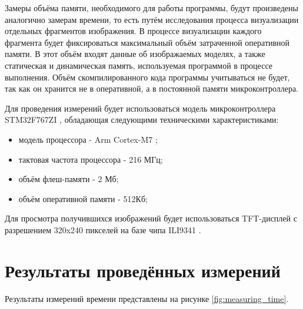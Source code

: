 Замеры объёма памяти, необходимого для работы программы, будут произведены аналогично замерам времени, то есть путём исследования 
процесса визуализации отдельных фрагментов изображения. В процессе визуализации каждого фрагмента будет фиксироваться максимальный 
объём затраченной оперативной памяти. В этот объём входят данные об изображаемых моделях, а также статическая и динамическая память, 
используемая программой в процессе выполнения. Объём скомпилированного кода программы учитываться не будет, так как он хранится 
не в оперативной, а в постоянной памяти микроконтроллера.

Для проведения измерений будет использоваться модель микроконтроллера STM32F767ZI \cite{STM32F767ZI}, обладающая следующими 
техническими характеристиками:
\begin{itemize}
	\item модель процессора - Arm Cortex-M7 \cite{cortex_m7};
	\item тактовая частота процессора - 216 МГц;
	\item объём флеш-памяти - 2 Мб;
    \item объём оперативной памяти - 512Кб;
\end{itemize}

Для просмотра получившихся изображений будет использоваться TFT-дисплей с разрешением 320x240 пикселей на базе чипа ILI9341 \cite{ili9341}.



\section{Результаты проведённых измерений}
Результаты измерений времени представлены на рисунке \ref{fig:measuring_time}.

        
        

        
